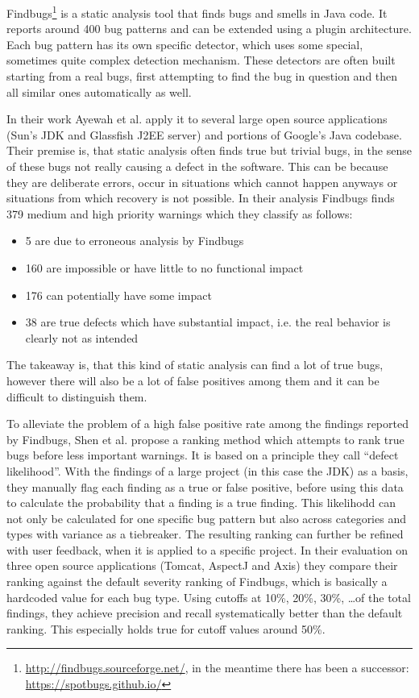Findbugs\footnote{\url{http://findbugs.sourceforge.net/}, in the meantime there has been a successor: \url{https://spotbugs.github.io/}} is a static analysis tool that finds bugs and smells in Java code.
It reports around 400 bug patterns and can be extended using a plugin architecture.
Each bug pattern has its own specific detector, which uses some special, sometimes quite complex detection mechanism.
These detectors are often built starting from a real bugs, first attempting to find the bug in question and then all similar ones automatically as well.

In their work Ayewah et al. \cite{ayewah2007evaluating} apply it to several large open source applications (Sun's JDK and Glassfish J2EE server) and portions of Google's Java codebase.
Their premise is, that static analysis often finds true but trivial bugs, in the sense of these bugs not really causing a defect in the software.
This can be because they are deliberate errors, occur in situations which cannot happen anyways or situations from which recovery is not possible.
In their analysis Findbugs finds 379 medium and high priority warnings which they classify as follows:
\begin{itemize}
    \item 5 are due to erroneous analysis by Findbugs
    \item 160 are impossible or have little to no functional impact
    \item 176 can potentially have some impact
    \item 38 are true defects which have substantial impact, i.e. the real behavior is clearly not as intended
\end{itemize}
The takeaway is, that this kind of static analysis can find a lot of true bugs, however there will also be a lot of false positives among them and it can be difficult to distinguish them.

To alleviate the problem of a high false positive rate among the findings reported by Findbugs, Shen et al. \cite{shen2011efindbugs} propose a ranking method which attempts to rank true bugs before less important warnings.
It is based on a principle they call ``defect likelihood''.
With the findings of a large project (in this case the JDK) as a basis, they manually flag each finding as a true or false positive, before using this data to calculate the probability that a finding is a true finding.
This likelihodd can not only be calculated for one specific bug pattern but also across categories and types with variance as a tiebreaker.
The resulting ranking can further be refined with user feedback, when it is applied to a specific project.
In their evaluation on three open source applications (Tomcat, AspectJ and Axis) they compare their ranking against the default severity ranking of Findbugs, which is basically a hardcoded value for each bug type.
Using cutoffs at 10\%, 20\%, 30\%, \ldots of the total findings, they achieve precision and recall systematically better than the default ranking.
This especially holds true for cutoff values around 50\%.


